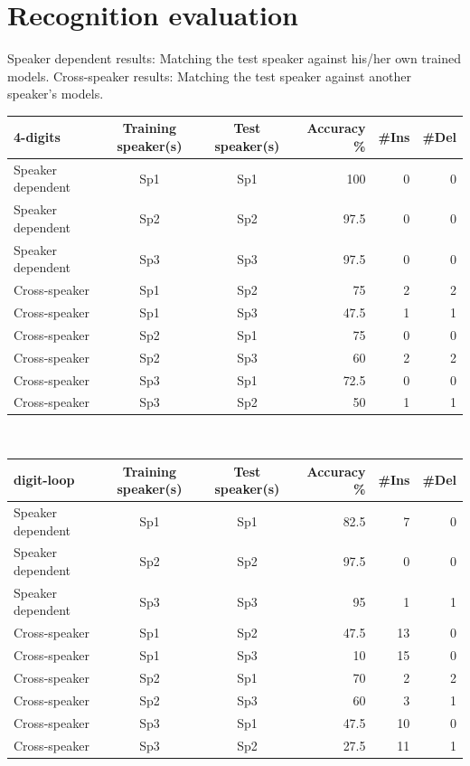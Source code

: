 \documentclass[onecolumn]{article}
\begin{document}
\section*{Recognition evaluation}
Speaker dependent results: Matching the test speaker against his/her own trained models. Cross-speaker results: Matching the test speaker against another speaker’s models.\\[5mm]
\begin{tabular}{|l|c|c|r|r|r|}
\hline
\textbf{4-digits}  & Training speaker(s) & Test speaker(s) & Accuracy \% & \#Ins & \#Del \\
\hline
Speaker dependent & Sp1 & Sp1 & 100 & 0 & 0 \\\hline
Speaker dependent & Sp2 & Sp2 & 97.5 & 0 &  0 \\\hline
Speaker dependent & Sp3 & Sp3 & 97.5 & 0 &  0 \\\hline
Cross-speaker & Sp1 & Sp2 & 75 & 2 & 2 \\\hline
Cross-speaker & Sp1 & Sp3 & 47.5 & 1 &  1 \\\hline
Cross-speaker & Sp2 & Sp1 & 75 & 0 & 0 \\\hline
Cross-speaker & Sp2 & Sp3 & 60 & 2 & 2 \\\hline
Cross-speaker & Sp3 & Sp1 & 72.5 & 0 & 0 \\\hline
Cross-speaker & Sp3 & Sp2 & 50 & 1 & 1 \\\hline
\end{tabular}\\[5mm]
\begin{tabular}{|l|c|c|r|r|r|}
\hline
\textbf{digit-loop}  & Training speaker(s) & Test speaker(s) & Accuracy \% & \#Ins & \#Del \\
\hline
Speaker dependent & Sp1 & Sp1 & 82.5 & 7 & 0 \\\hline
Speaker dependent & Sp2 & Sp2 & 97.5 & 0 & 0 \\\hline
Speaker dependent & Sp3 & Sp3 & 95 & 1 & 1 \\\hline
Cross-speaker & Sp1 & Sp2 & 47.5 & 13 & 0 \\\hline
Cross-speaker & Sp1 & Sp3 & 10 & 15 & 0 \\\hline
Cross-speaker & Sp2 & Sp1 & 70 & 2 & 2 \\\hline
Cross-speaker & Sp2 & Sp3 & 60 & 3 & 1 \\\hline
Cross-speaker & Sp3 & Sp1 & 47.5 & 10 & 0 \\\hline
Cross-speaker & Sp3 & Sp2 & 27.5 & 11 & 1 \\\hline
\end{tabular}
\end{document}
